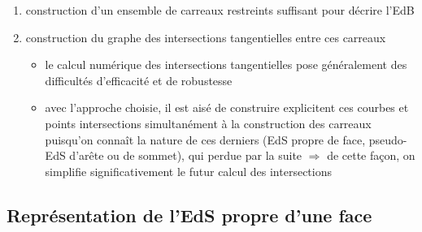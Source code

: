 \begin{enumerate}
	\item construction d'un ensemble de carreaux restreints suffisant pour décrire l'EdB 
	\item construction du graphe des intersections tangentielles entre ces carreaux
	\begin{itemize}
		\item le calcul numérique des intersections tangentielles pose généralement des difficultés d'efficacité et de robustesse
		\item avec l'approche choisie, il est aisé de construire explicitent ces courbes et points intersections simultanément à la construction des carreaux puisqu'on connaît la nature de ces derniers (EdS propre de face, pseudo-EdS d'arête ou de sommet), qui perdue par la suite $\Rightarrow$ de cette façon, on simplifie significativement le futur calcul des intersections
	\end{itemize}
\end{enumerate}



\subsection{Représentation de l'EdS propre d'une face \brep}%
\label{section:parametrisation_eds_propre_face}
\def\indice{_0}
\def\carreau{\Sigma\indice}
\def\face{\brepface\indice}

